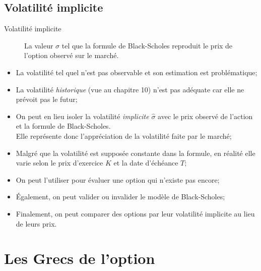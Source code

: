 \documentclass[10pt, french]{article}
\begin{document}
\begin{multicols*}{2}
\subsection*{Volatilité implicite}
\begin{description}
	\item[Volatilité implicite]	La valeur $\sigma$ tel que la formule de Black-Scholes reproduit le prix de l’option observé sur le marché.
\end{description}
\begin{itemize}[leftmargin = *]
	\item	La volatilité tel quel n'est pas observable et son estimation est problématique;
	\item	La volatilité \textit{historique} (vue au chapitre 10) n'est pas adéquate car elle ne prévoit pas le futur;
	\item	On peut en lieu isoler la volatilité \textit{implicite} $\hat{\sigma}$ avec le prix observé de l'action et la formule de Black-Scholes.	\\
			Elle représente donc l'appréciation de la volatilité faite par le marché;
	\item	Malgré que la volatilité est supposée constante dans la formule, en réalité elle varie selon le prix d'exercice $K$ et la date d'échéance $T$;
	\item	On peut l'utiliser pour évaluer une option qui n'existe pas encore;
	\item	Également, on peut valider ou invalider le modèle de Black-Scholes;
	\item	Finalement, on peut comparer des options par leur volatilité implicite au lieu de leurs prix.
\end{itemize}

\newpage


\section*{Les Grecs de l'option}


\end{multicols*}
\end{document}
